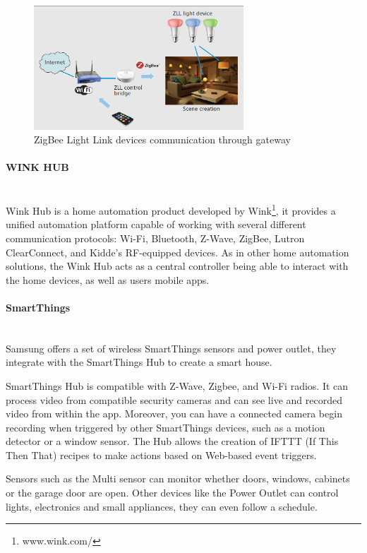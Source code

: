 \begin{figure}[h]
\centering
\includegraphics[width=0.7\textwidth]{Figures/philips_hue_refazer}
\caption{ZigBee Light Link devices communication through gateway}
\label{fig:zll}
\end{figure}

\paragraph{WINK HUB}\mbox{}\\

Wink Hub is a home automation product developed by Wink\footnote{www.wink.com/}, it provides a unified automation platform capable of working with several different communication protocols: Wi-Fi, Bluetooth, Z-Wave, ZigBee, Lutron ClearConnect, and Kidde's RF-equipped devices.
As in other home automation solutions, the Wink Hub acts as a central controller being able to interact with the home devices, as well as users mobile apps.

\paragraph{SmartThings}\mbox{}\\

Samsung offers a set of wireless SmartThings sensors and power outlet, they integrate with the SmartThings Hub to create a smart house.

SmartThings Hub is compatible with Z-Wave, Zigbee, and Wi-Fi radios. It can process video from compatible security cameras and can see live and recorded video from within the app. Moreover, you can have a connected camera begin recording when triggered by other SmartThings devices, such as a motion detector or a window sensor. 
The Hub allows the creation of IFTTT (If This Then That) recipes to make actions based on Web-based event triggers.

Sensors such as the Multi sensor can monitor whether doors, windows, cabinets or the garage door are open. Other devices like the Power Outlet can control lights, electronics and small appliances, they can even follow a schedule.


